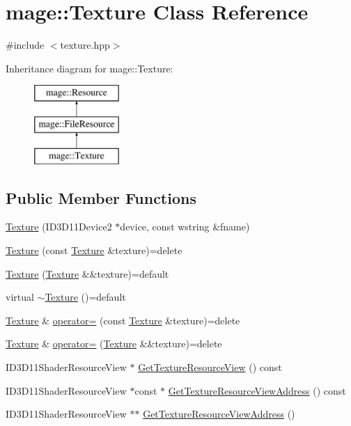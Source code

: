 \hypertarget{classmage_1_1_texture}{}\section{mage\+:\+:Texture Class Reference}
\label{classmage_1_1_texture}


{\ttfamily \#include $<$texture.\+hpp$>$}

Inheritance diagram for mage\+:\+:Texture\+:\begin{figure}[H]
\begin{center}
\leavevmode
\includegraphics[height=3.000000cm]{classmage_1_1_texture}
\end{center}
\end{figure}
\subsection*{Public Member Functions}
\begin{DoxyCompactItemize}
\item 
\hyperlink{classmage_1_1_texture_a680c4df56476b4c66c1e2ffd5bef63c2}{Texture} (I\+D3\+D11\+Device2 $\ast$device, const wstring \&fname)
\item 
\hyperlink{classmage_1_1_texture_aed9e8ab5bc3efdeb381672fd4e243ea7}{Texture} (const \hyperlink{classmage_1_1_texture}{Texture} \&texture)=delete
\item 
\hyperlink{classmage_1_1_texture_a9297257bfe76e744cb02bbbb51f73348}{Texture} (\hyperlink{classmage_1_1_texture}{Texture} \&\&texture)=default
\item 
virtual \hyperlink{classmage_1_1_texture_a81664804ac0259e8c67851409ee106fa}{$\sim$\+Texture} ()=default
\item 
\hyperlink{classmage_1_1_texture}{Texture} \& \hyperlink{classmage_1_1_texture_a0b73b4df98d729c8f60e58b0ca065636}{operator=} (const \hyperlink{classmage_1_1_texture}{Texture} \&texture)=delete
\item 
\hyperlink{classmage_1_1_texture}{Texture} \& \hyperlink{classmage_1_1_texture_a765e9cf3bddedbe2795dea0fe57245ff}{operator=} (\hyperlink{classmage_1_1_texture}{Texture} \&\&texture)=delete
\item 
I\+D3\+D11\+Shader\+Resource\+View $\ast$ \hyperlink{classmage_1_1_texture_a8b04efb947c49819642f86c8a16f813b}{Get\+Texture\+Resource\+View} () const
\item 
I\+D3\+D11\+Shader\+Resource\+View $\ast$const  $\ast$ \hyperlink{classmage_1_1_texture_ae7a45b80e575237d218dc9c6f059e87c}{Get\+Texture\+Resource\+View\+Address} () const
\item 
I\+D3\+D11\+Shader\+Resource\+View $\ast$$\ast$ \hyperlink{classmage_1_1_texture_a322ee2751dbd9ccfb245c6d481dfc803}{Get\+Texture\+Resource\+View\+Address} ()
\end{DoxyCompactItemize}
